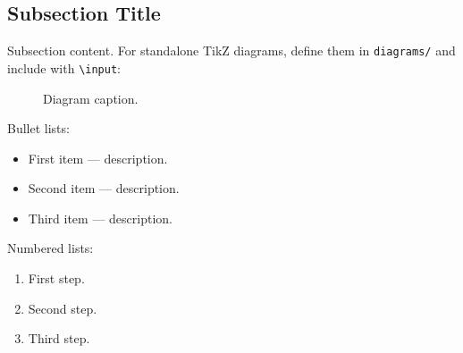 \subsection{Subsection Title}
\label{sec:N_SECTION_2_SUB_2}

Subsection content. For standalone TikZ diagrams, define them in \texttt{diagrams/} and
include with \texttt{\textbackslash input}:

\begin{figure}[!ht]
  \centering
  
  \caption{Diagram caption.}
  \label{fig:N_diagram}
\end{figure}

Bullet lists:
\begin{itemize}
  \item First item — description.
  \item Second item — description.
  \item Third item — description.
\end{itemize}

Numbered lists:
\begin{enumerate}
  \item First step.
  \item Second step.
  \item Third step.
\end{enumerate}
